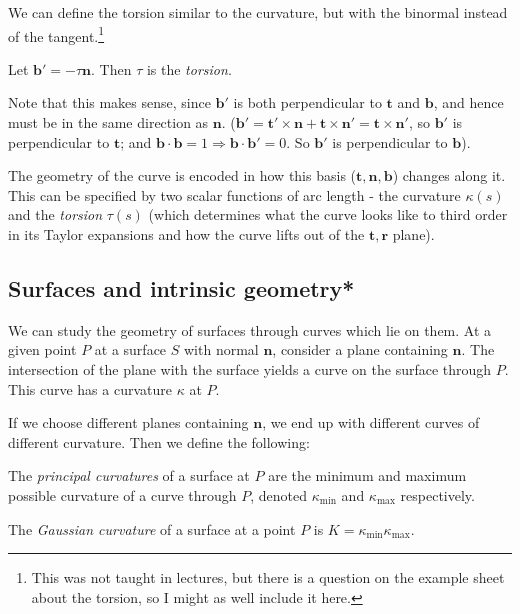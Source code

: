 \documentclass[a4paper]{article}
\begin{document}
We can define the torsion similar to the curvature, but with the binormal instead of the tangent.\footnote{This was not taught in lectures, but there is a question on the example sheet about the torsion, so I might as well include it here.}

\begin{defi}[Torsion]  Let $\mathbf{b}' = -\tau \mathbf{n}$. Then $\tau$ is the \emph{torsion}.
\end{defi}
Note that this makes sense, since $\mathbf{b}'$ is both perpendicular to $\mathbf{t}$ and $\mathbf{b}$, and hence must be in the same direction as $\mathbf{n}$. ($\mathbf{b}' = \mathbf{t}'\times \mathbf{n} + \mathbf{t}\times \mathbf{n}' = \mathbf{t}\times \mathbf{n}'$, so $\mathbf{b}'$ is perpendicular to $\mathbf{t}$; and $\mathbf{b} \cdot \mathbf{b} = 1\Rightarrow \mathbf{b}\cdot \mathbf{b}' = 0$. So $\mathbf{b}'$ is perpendicular to $\mathbf{b}$).

The geometry of the curve is encoded in how this basis ($\mathbf{t}, \mathbf{n}, \mathbf{b}$) changes along it. This can be specified by two scalar functions of arc length - the curvature $\kappa(s)$ and the \emph{torsion} $\tau(s)$ (which determines what the curve looks like to third order in its Taylor expansions and how the curve lifts out of the $\mathbf{t}, \mathbf{r}$ plane).

\subsection{Surfaces and intrinsic geometry*}
We can study the geometry of surfaces through curves which lie on them. At a given point $P$ at a surface $S$ with normal $\mathbf{n}$, consider a plane containing $\mathbf{n}$. The intersection of the plane with the surface yields a curve on the surface through $P$. This curve has a curvature $\kappa$ at $P$.

If we choose different planes containing $\mathbf{n}$, we end up with different curves of different curvature. Then we define the following:
\begin{defi}
  The \emph{principal curvatures} of a surface at $P$ are the minimum and maximum possible curvature of a curve through $P$, denoted $\kappa_{\min}$ and $\kappa_{\max}$ respectively.
\end{defi}

\begin{defi}
  The \emph{Gaussian curvature} of a surface at a point $P$ is $K = \kappa_{\min}\kappa_{\max}$.
\end{defi}
\end{document}
